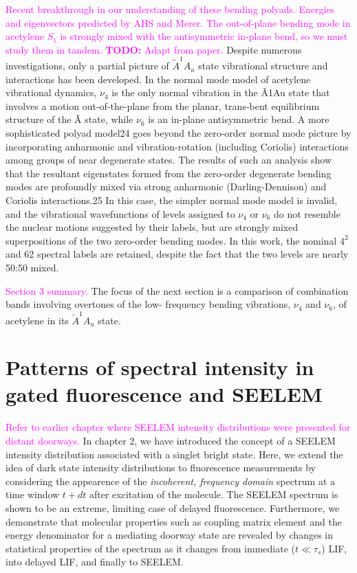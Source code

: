\documentclass[12pt,draft]{mitthesis}
\newcommand{\TODO} [1]{\textcolor{magenta}{\textbf{TODO:} #1}}
\newcommand{\POINT}[1]{\textcolor{magenta}{#1}}
\begin{document}
\POINT{Recent breakthrough in our understanding of these bending
  polyads.  Energies and eigenvectors predicted by AHS and Merer.  The
  out-of-plane bending mode in acetylene $S_1$ is strongly mixed with
  the antisymmetric in-plane bend, so we must study them in tandem.}
\TODO{Adapt from paper.}  Despite numerous investigations, only a
partial picture of $\tilde{A} ^1A_u$ state vibrational structure and
interactions has been developed.  In the normal mode model of
acetylene vibrational dynamics, $\nu_4$ is the only normal vibration
in the Ã1Au state that involves a motion out-of-the-plane from the
planar, trans-bent equilibrium structure of the Ã state, while $\nu_6$ is
an in-plane antisymmetric bend. A more sophisticated polyad model24
goes beyond the zero-order normal mode picture by incorporating
anharmonic and vibration-rotation (including Coriolis) interactions
among groups of near degenerate states. The results of such an
analysis show that the resultant eigenstates formed from the
zero-order degenerate bending modes are profoundly mixed via strong
anharmonic (Darling-Dennison) and Coriolis interactions.25 In this
case, the simpler normal mode model is invalid, and the vibrational
wavefunctions of levels assigned to $\nu_4$ or $\nu_6$ do not resemble the
nuclear motions suggested by their labels, but are strongly mixed
superpositions of the two zero-order bending modes.  In this work, the
nominal $4^2$ and 62 spectral labels are retained, despite the fact
that the two levels are nearly 50:50 mixed.

\POINT{Section 3 summary.}  The focus of the next section is a
comparison of combination bands involving overtones of the low-
frequency bending vibrations, $\nu_4$ and $\nu_6$, of acetylene in its
$\tilde{A} ^1A_u$ state.



\section{Patterns of spectral intensity in gated fluorescence and
  SEELEM}

\POINT{Refer to earlier chapter where SEELEM intensity distributions
  were presented for distant doorways.}  In chapter 2, we have
introduced the concept of a SEELEM intensity distribution associated
with a singlet bright state.  Here, we extend the idea of dark state
intensity distributions to fluorescence measurements by considering
the appearence of the \emph{incoherent, frequency domain} spectrum at
a time window $t+dt$ after excitation of the molecule.  The SEELEM
spectrum is shown to be an extreme, limiting case of delayed
fluorescence.  Furthermore, we demonstrate that molecular properties
such as coupling matrix element and the energy denominator for a
mediating doorway state are revealed by changes in statistical
properties of the spectrum as it changes from immediate ($t\ll\tau_s$)
LIF, into delayed LIF, and finally to SEELEM.
\end{document}

